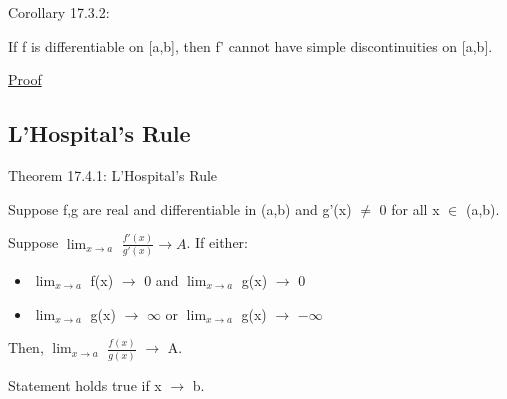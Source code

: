     \vspace{0.5cm}

{ \color{orange} Corollary 17.3.2:  }

    \begin{adjustbox}{minipage=14cm, right, vspace=0.1cm 0cm}
        If f is differentiable on [a,b], then f' cannot have simple discontinuities
        on [a,b].
    \end{adjustbox}

{ \color{magenta} \underline{Proof} }






\subsection{ L'Hospital's Rule }

{ \color{red} Theorem 17.4.1: L'Hospital's Rule }

    \begin{adjustbox}{minipage=14cm, right, vspace=0.1cm 0cm}
        Suppose f,g are real and differentiable in (a,b) and g'(x) $\not =$ 0
        for all x $\in$ (a,b).
        
        Suppose $\lim_{x \rightarrow a}$ $\frac{f'(x)}{g'(x)} \rightarrow A$.
        If either:
        
        \begin{itemize}[leftmargin=1cm, itemsep=0.1cm]
            \item                        
                $\lim_{x \rightarrow a}$ f(x) $\rightarrow$ 0 and
                $\lim_{x \rightarrow a}$ g(x) $\rightarrow$ 0

            \item
                $\lim_{x \rightarrow a}$ g(x) $\rightarrow$ $\infty$ or
                $\lim_{x \rightarrow a}$ g(x) $\rightarrow$ $-\infty$
        \end{itemize}

        Then, $\lim_{x \rightarrow a}$ $\frac{f(x)}{g(x)}$ $\rightarrow$ A.

        Statement holds true if x $\rightarrow$ b.
    \end{adjustbox}

    \newpage





